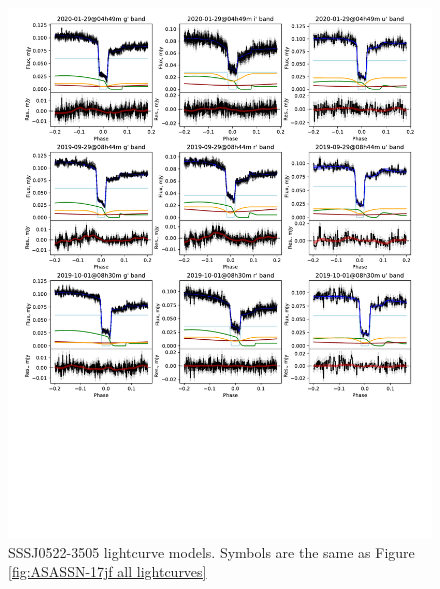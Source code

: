 \begin{figure}
    \centering
    \includegraphics[width=\columnwidth, trim={0cm 10cm 0cm 0cm}, clip]{figures/three_cvs_with_weird_colours/SSS111126/SSS111126_lightcurves_3.pdf}
    \caption{SSSJ0522-3505 lightcurve models. Symbols are the same as Figure \ref{fig:ASASSN-17jf all lightcurves}}
    \label{fig:SSSJ0522-3505 all lightcurves}
\end{figure}


